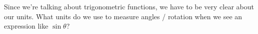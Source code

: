 \documentclass{ximera}
\begin{document}
\begin{problem}
   Since we're talking about trigonometric functions, we have to be very clear about our units.  What units do we use to measure angles / rotation when we see an expression like $\sin \theta$?
    \begin{multipleChoice}
     \end{multipleChoice}
\end{problem}



\end{document}
